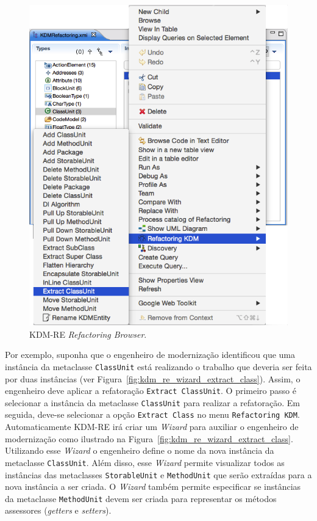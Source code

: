 \begin{figure}[h]
	\centering
	\caption{KDM-RE \textit{Refactoring Browser}.}
	\label{fig:kdm_re_refactoring_arvore}
	\includegraphics[scale=0.55]{images/novoMenuPopupKDM_RE}
	\fautor
\end{figure}


Por exemplo, suponha que o engenheiro de modernização identificou que uma instância da metaclasse \texttt{ClassUnit} está realizando o trabalho que deveria ser feita por duas instâncias (ver Figura~\ref{fig:kdm_re_wizard_extract_class}). Assim, o engenheiro deve aplicar a refatoração \texttt{Extract ClassUnit}. O primeiro passo é selecionar a instância da metaclasse \texttt{ClassUnit} para realizar a refatoração. Em seguida, deve-se selecionar a opção \texttt{Extract Class} no menu \texttt{Refactoring KDM}. Automaticamente KDM-RE irá criar um \textit{Wizard} para auxiliar o engenheiro de modernização como ilustrado na Figura~\ref{fig:kdm_re_wizard_extract_class}. Utilizando esse \textit{Wizard} o engenheiro define o nome da nova instância da metaclasse \texttt{ClassUnit}. Além disso, esse \textit{Wizard} permite visualizar todos as instâncias das metaclasses \texttt{StorableUnit} e \texttt{MethodUnit} que serão extraídas para a nova instância a ser criada. O \textit{Wizard} também permite especificar se instâncias da metaclasse \texttt{MethodUnit} devem ser criada para representar os métodos assessores (\textit{getters} e \textit{setters}). 

